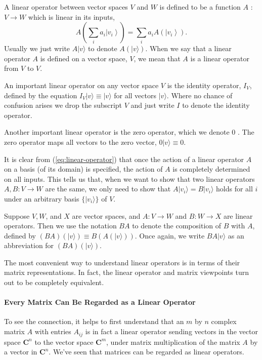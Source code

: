 A linear operator between vector spaces $V$ and $W$ is defined to be a function $A$ : $V \rightarrow W$ which is linear in its inputs,
\begin{equation}
    \label{eq:linear-operator}
A\left(\sum_{i} a_{i}\left|v_{i}\right\rangle\right)=\sum_{i} a_{i} A\left(\left|v_{i}\right\rangle\right).
\end{equation}
Usually we just write $A|v\rangle$ to denote $A(|v\rangle)$. When we say that a linear operator $A$ is defined on a vector space, $V$, we mean that $A$ is a linear operator from $V$ to $V$. 

\begin{example}
    An important linear operator on any vector space $V$ is the identity operator, $I_{V}$, defined by the equation $I_{V}|v\rangle \equiv|v\rangle$ for all vectors $|v\rangle$. Where no chance of confusion arises we drop the subscript $V$ and just write $I$ to denote the identity operator. 
\end{example}

\begin{example}
    Another important linear operator is the zero operator, which we denote 0 . The zero operator maps all vectors to the zero vector, $0|v\rangle \equiv 0$. 
\end{example}

It is clear from (\ref{eq:linear-operator}) that once the action of a linear operator $A$ on a basis (of its domain) is specified, the action of $A$ is completely determined on all inputs. This tells us that, when we want to show that two linear operators $A,B:V \rightarrow W$ are the same, we only need to show that $A |v_{i}\rangle = B|v_{i}\rangle$ holds for all $i$ under an arbitrary basis $\{|v_{i}\rangle\}$ of $V.$

Suppose $V, W$, and $X$ are vector spaces, and $A: V \rightarrow W$ and $B: W \rightarrow X$ are linear operators. Then we use the notation $B A$ to denote the composition of $B$ with $A$, defined by $(B A)(|v\rangle) \equiv B(A(|v\rangle))$. Once again, we write $B A|v\rangle$ as an abbreviation for $(B A)(|v\rangle)$.

The most convenient way to understand linear operators is in terms of their matrix representations. In fact, the linear operator and matrix viewpoints turn out to be completely equivalent. 

\paragraph{Every Matrix Can Be Regarded as a Linear Operator}
To see the connection, it helps to first understand that an $m$ by $n$ complex matrix $A$ with entries $A_{i j}$ is in fact a linear operator sending vectors in the vector space $\mathbf{C}^{n}$ to the vector space $\mathbf{C}^{m}$, under matrix multiplication of the matrix $A$ by a vector in $\mathbf{C}^{n}$. We've seen that matrices can be regarded as linear operators.


